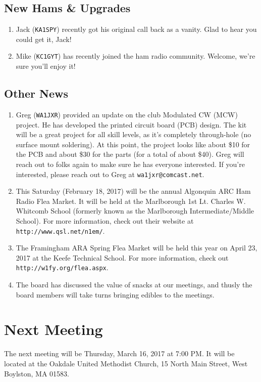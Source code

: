 \documentclass[10pt,letterpaper]{article}
\begin{document}
\subsection{New Hams \& Upgrades}
\begin{enumerate}
  \item Jack (\texttt{KA1SPY}) recently got his original call back as a vanity. Glad to hear you could get it, Jack!
  \item Mike (\texttt{KC1GYT}) has recently joined the ham radio community. Welcome, we're sure you'll enjoy it!
\end{enumerate}

\subsection{Other News}
\begin{enumerate}
  \item Greg (\texttt{WA1JXR}) provided an update on the club Modulated CW (MCW) project. He has developed the printed circuit board (PCB) design. The kit will be a great project for all skill levels, as it's completely through-hole (no surface mount soldering). At this point, the project looks like about \$10 for the PCB and about \$30 for the parts (for a total of about \$40). Greg will reach out to folks again to make sure he has everyone interested. If you're interested, please reach out to Greg at \texttt{wa1jxr@comcast.net}.
  \item This Saturday (February 18, 2017) will be the annual Algonquin ARC Ham Radio Flea Market. It will be held at the Marlborough 1st Lt. Charles W. Whitcomb School (formerly known as the Marlborough Intermediate/Middle School). For more information, check out their website at\\ \texttt{http://www.qsl.net/n1em/}.
  \item The Framingham ARA Spring Flea Market will be held this year on April 23, 2017 at the Keefe Technical School. For more information, check out \texttt{http://w1fy.org/flea.aspx}.
  \item The board has discussed the value of snacks at our meetings, and thusly the board members will take turns bringing edibles to the meetings.
\end{enumerate}

\section{Next Meeting}
The next meeting will be Thursday, March 16, 2017 at 7:00 PM. It will be located at the Oakdale United Methodist Church, 15 North Main Street, West Boylston, MA 01583.\\
\end{document}
